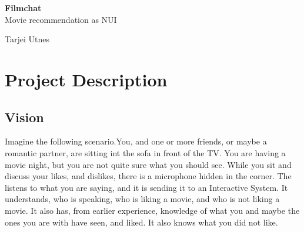 \documentclass[11pt,fleqn]{book} %
\begin{document}

\begingroup
\thispagestyle{empty}
\centering
\vspace*{5cm}
\par\normalfont\fontsize{32}{32}\sffamily\selectfont
\textbf{Filmchat}\\
{\LARGE Movie recommendation as NUI}\par %
\vspace*{1cm}
{\Huge Tarjei Utnes}\par %
\endgroup



\pagestyle{empty} %

\tableofcontents %


\pagestyle{fancy} %



\chapter{Project Description}
\section{Vision}
Imagine the following scenario.You, and one or more friends, or maybe a romantic partner, are sitting int the sofa in front of the TV. You are having a movie night, but you are not quite sure what you should see. While you sit and discuss your likes, and dislikes, there is a microphone hidden in the corner. The listens to what you are saying, and it is sending it to an Interactive System. It understands, who is speaking, who is liking a movie, and who is not liking a movie. It also has, from earlier experience, knowledge of what you and maybe the ones you are with have seen, and liked. It also knows what you did not like.
\end{document}
